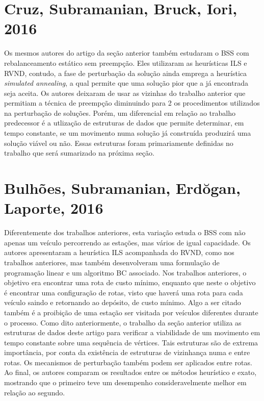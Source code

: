 \section{Cruz, Subramanian, Bruck, Iori, 2016}\label{sec:LABEL_CHP_2_SEC_F}

Os mesmos autores do artigo da seção anterior também estudaram o BSS com rebalanceamento estático sem preempção. Eles utilizaram as heurísticas ILS e RVND, contudo, a fase de perturbação da solução ainda emprega a heurística \textit{simulated annealing}, a qual permite que uma solução pior que a já encontrada seja aceita. Os autores deixaram de usar as vizinhas do trabalho anterior que permitiam a técnica de preempção diminuindo para 2 os procedimentos utilizados na perturbação de soluções. Porém, um diferencial em relação ao trabalho predecessor é a utlização de estruturas de dados que permite determinar, em tempo constante, se um movimento numa solução já construída produzirá uma solução viável ou não. Essas estruturas foram primariamente definidas no trabalho que será sumarizado na próxima seção.

\section{Bulhões, Subramanian, Erd\u{o}gan, Laporte, 2016}\label{sec:LABEL_CHP_2_SEC_G}

Diferentemente dos trabalhos anteriores, esta variação estuda o BSS com não apenas um veículo percorrendo as estações, mas vários de igual capacidade. Os autores apresentaram a heurística ILS acompanhada do RVND, como nos trabalhos anteriores, mas também desenvolveram uma formulação de programação linear e um algoritmo BC associado. Nos trabalhos anteriores, o objetivo era encontrar uma rota de custo mínimo, enquanto que neste o objetivo é encontrar uma configuração de rotas, visto que haverá uma rota para cada veículo saindo e retornando ao depósito, de custo mínimo. Algo a ser citado também é a proibição de uma estação ser visitada por veículos diferentes durante o processo. Como dito anteriormente, o trabalho da seção anterior utiliza as estruturas de dados deste artigo para verificar a viabilidade de um movimento em tempo constante sobre uma sequência de vértices. Tais estruturas são de extrema importância, por conta da existência de estruturas de vizinhança numa e entre rotas. Os mecanismos de perturbação também podem ser aplicados entre rotas. Ao final, os autores comparam os resultados entre os métodos heurístico e exato, mostrando que o primeiro teve um desempenho consideravelmente melhor em relação ao segundo.